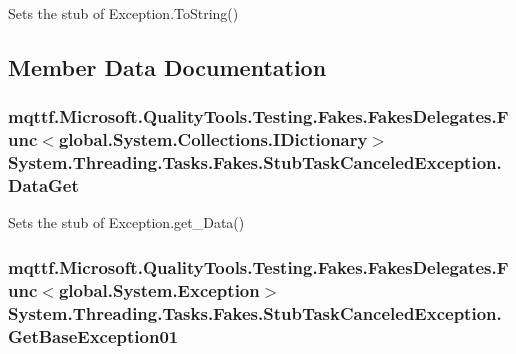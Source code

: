 Sets the stub of Exception.\-To\-String()



\subsection{Member Data Documentation}
\hypertarget{class_system_1_1_threading_1_1_tasks_1_1_fakes_1_1_stub_task_canceled_exception_ab8408366b3803560e7628dbcdc6419b1}{
\subsubsection[{Data\-Get}]{\setlength{\rightskip}{0pt plus 5cm}mqttf.\-Microsoft.\-Quality\-Tools.\-Testing.\-Fakes.\-Fakes\-Delegates.\-Func$<$global.\-System.\-Collections.\-I\-Dictionary$>$ System.\-Threading.\-Tasks.\-Fakes.\-Stub\-Task\-Canceled\-Exception.\-Data\-Get}}\label{class_system_1_1_threading_1_1_tasks_1_1_fakes_1_1_stub_task_canceled_exception_ab8408366b3803560e7628dbcdc6419b1}


Sets the stub of Exception.\-get\-\_\-\-Data()

\hypertarget{class_system_1_1_threading_1_1_tasks_1_1_fakes_1_1_stub_task_canceled_exception_aea30b2cfcc08f52c5f27a6696d3600b9}{
\subsubsection[{Get\-Base\-Exception01}]{\setlength{\rightskip}{0pt plus 5cm}mqttf.\-Microsoft.\-Quality\-Tools.\-Testing.\-Fakes.\-Fakes\-Delegates.\-Func$<$global.\-System.\-Exception$>$ System.\-Threading.\-Tasks.\-Fakes.\-Stub\-Task\-Canceled\-Exception.\-Get\-Base\-Exception01}}\label{class_system_1_1_threading_1_1_tasks_1_1_fakes_1_1_stub_task_canceled_exception_aea30b2cfcc08f52c5f27a6696d3600b9}


